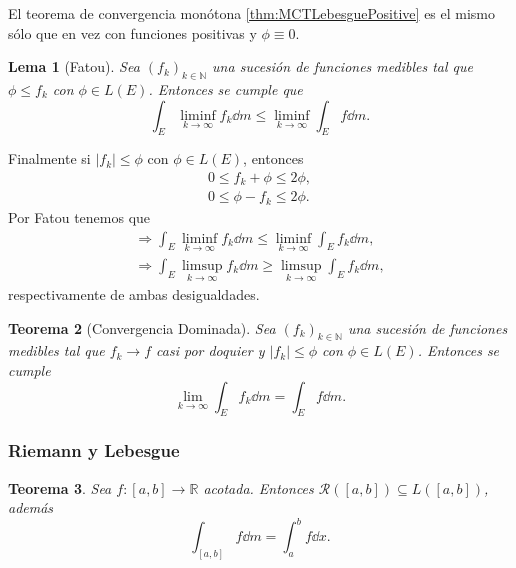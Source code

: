 \documentclass[12pt]{article}
\theoremstyle{plain}
\newtheorem{Th}{Teorema}[subsection]   %
\newtheorem{Lem}[Th]{Lema}             %
\theoremstyle{definition}
\theoremstyle{remark}
\numberwithin{equation}{section}
\newcommand{\bN}{\mathbb{N}}        %
\newcommand{\bR}{\mathbb{R}}        %
\newcommand{\cR}{\mathcal{R}}       %
\renewcommand{\geq}{\geqslant}      %
\renewcommand{\leq}{\leqslant}      %
\renewcommand{\:}{\colon}           %
\newcommand{\bonj}[1]{\left\lbrack#1\right\rbrack}
\begin{document}
\begin{multicols}{2}
El teorema de convergencia monótona \ref{thm:MCTLebesguePositive} es el mismo sólo que en vez con funciones positivas y $\phi\equiv 0$.

\begin{Lem}[Fatou]\label{lem:Fatou}
  Sea $(f_k)_{k\in\bN}$ una sucesión de funciones medibles tal que $\phi\leq f_k$ con $\phi\in L(E)$. Entonces se cumple que
  $$\int_E\liminf_{k\to\infty}f_k\dd m\leq\liminf_{k\to\infty}\int_Ef\dd m.$$
\end{Lem}

Finalmente si $|f_k|\leq \phi$ con $\phi\in L(E)$, entonces
\begin{gather*}
  0\leq f_k+\phi\leq 2\phi,\\
  0\leq \phi-f_k\leq 2\phi.
\end{gather*}
Por Fatou tenemos que
\begin{gather*}
  \Rightarrow \int_E\liminf_{k\to\infty}f_k\dd m\leq\liminf_{k\to\infty}\int_E f_k\dd m,\\
  \Rightarrow \int_E\limsup_{k\to\infty}f_k\dd m\geq\limsup_{k\to\infty}\int_E f_k\dd m,
\end{gather*}
respectivamente de ambas desigualdades.

\begin{Th}[Convergencia Dominada]\label{thm:DCTLebesgue}
  Sea $(f_k)_{k\in\bN}$ una sucesión de funciones medibles tal que $f_k\to f$ casi por doquier y $|f_k|\leq \phi$ con $\phi\in L(E)$. Entonces se cumple
  $$\lim_{k\to\infty}\int_E f_k\dd m=\int_E f\dd  m.$$
\end{Th}

\subsubsection*{Riemann y Lebesgue}

\begin{Th}
  Sea $f\:\bonj{a,b}\to\bR$ acotada. Entonces $\cR(\bonj{a,b})\subseteq L(\bonj{a,b})$, además
  $$\int_{\bonj{a,b}}f\dd m=\int_{a}^{b}f\dd x.$$
\end{Th}


\end{multicols}
\end{document}
